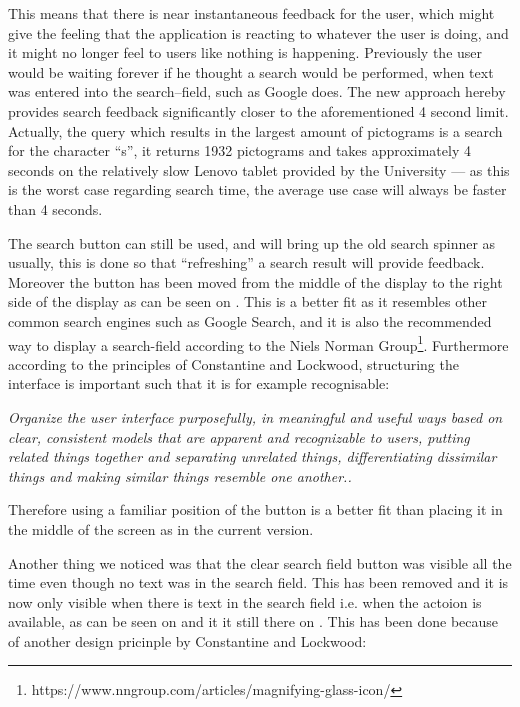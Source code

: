 This means that there is near instantaneous feedback for the user, which might give the feeling that the application is reacting to whatever the user is doing, and it might no longer feel to users like nothing is happening.
Previously the user would be waiting forever if he thought a search would be performed, when text was entered into the search--field, such as Google does. 
The new approach hereby provides search feedback significantly closer to the aforementioned 4 second limit.
Actually, the query which results in the largest amount of pictograms is a search for the character \enquote{s}, it returns 1932 pictograms and takes approximately 4 seconds on the relatively slow Lenovo tablet provided by the University --- as this is the worst case regarding search time, the average use case will always be faster than 4 seconds. 

The search button can still be used, and will bring up the old search spinner as usually, this is done so that \enquote{refreshing} a search result will provide feedback. 
Moreover the button has been moved from the middle of the display to the right side of the display as can be seen on . 
This is a better fit as it resembles other common search engines such as Google Search, and it is also the recommended way to display a search-field according to the Niels Norman Group\footnote{https://www.nngroup.com/articles/magnifying-glass-icon/}.
Furthermore according to the principles of Constantine and Lockwood, structuring the interface is important such that it is for example recognisable: 

\begin{displayquote}
\textit{Organize the user interface purposefully, in meaningful and useful ways based on clear, consistent models that are apparent and recognizable to users, putting related things together and separating unrelated things, differentiating dissimilar things and making similar things resemble one
another.\cite[p.~51]{DESIGNBOOK}.}
\end{displayquote}
\noindent
Therefore using a familiar position of the button is a better fit than placing it in the middle of the screen as in the current version.

Another thing we noticed was that the clear search field button was visible all the time even though no text was in the search field.
This has been removed and it is now only visible when there is text in the search field i.e. when the actoion is available, as can be seen on  and it it still there on .
This has been done because of another design pricinple by Constantine and Lockwood: 

